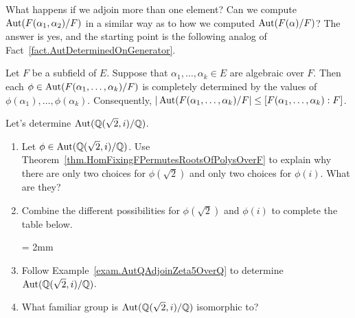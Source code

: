 What happens if we adjoin more than one element? Can we compute $\operatorname{Aut}(F(\alpha_1,\alpha_2)/F)$ in a similar way as to how we computed $\operatorname{Aut}(F(\alpha)/F)$? The answer is yes, and the starting point is the following analog of Fact~\ref{fact.AutDeterminedOnGenerator}.

\begin{fact}
Let $F$ be a subfield of $E$. Suppose that $\alpha_1,\ldots,\alpha_k\in E$ are algebraic over $F$. Then each $\phi\in \operatorname{Aut}({F}(\alpha_1,\ldots,\alpha_k)/F)$ is completely determined by the values of $\phi(\alpha_1),\ldots,\phi(\alpha_k)$. Consequently,  $|\operatorname{Aut}({F}(\alpha_1,\ldots,\alpha_k)/F|\le  [F(\alpha_1,\ldots,\alpha_k):F]$.
\end{fact}

\begin{problem}\label{prob.AutQAdjoinSqrt2AndiOverQ}
Let's determine $\operatorname{Aut}(\mathbb{Q}(\sqrt{2},i)/\mathbb{Q})$.
\begin{enumerate}
\item Let $\phi\in  \operatorname{Aut}(\mathbb{Q}(\sqrt{2},i)/\mathbb{Q})$. Use Theorem~\ref{thm.HomFixingFPermutesRootsOfPolysOverF} to explain why there are only two choices for $\phi(\sqrt{2})$ and only two choices for $\phi(i)$. What are they?
\item Combine the different possibilities for $\phi(\sqrt{2})$ and $\phi(i)$ to complete the table below.
\begin{center}
\tabulinesep = 2mm
\end{center}
\item Follow Example~\ref{exam.AutQAdjoinZeta5OverQ} to determine $\operatorname{Aut}(\mathbb{Q}(\sqrt{2},i)/\mathbb{Q})$.
\item What familiar group is  $\operatorname{Aut}(\mathbb{Q}(\sqrt{2},i)/\mathbb{Q})$ isomorphic to?
\end{enumerate}
\end{problem}

